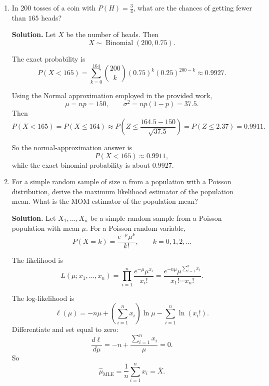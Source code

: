 \documentclass[12pt]{article}
\begin{document}
\begin{enumerate}[label=(\arabic*), leftmargin=*]
\begin{enumerate}[label=(\alph*), itemsep=0.5em]
    \item
    \[
    E(20X-12Y)=20E(X)-12E(Y)=20(23)-12(17)=256,
    \]
    and
    \[
    \operatorname{Var}(20X-12Y)=20^2\operatorname{Var}(X)+(-12)^2\operatorname{Var}(Y)
    =400(4)+144(16)=3904.
    \]

    \item
    \[
    E(5X+8Y)=5E(X)+8E(Y)=5(23)+8(17)=251,
    \]
    and
    \[
    \operatorname{Var}(5X+8Y)=5^2\operatorname{Var}(X)+8^2\operatorname{Var}(Y)
    =25(4)+64(16)=1124.
    \]
\end{enumerate}

\item In 200 tosses of a coin with $P(H)=\tfrac34$, what are the chances of getting fewer than $165$ heads?

\par\medskip
\noindent\textbf{Solution.}
Let $X$ be the number of heads. Then
\[
X\sim \operatorname{Binomial}(200,0.75).
\]

The exact probability is
\[
P(X<165)=\sum_{k=0}^{164}\binom{200}{k}(0.75)^k(0.25)^{200-k}\approx 0.9927.
\]

Using the Normal approximation employed in the provided work,
\[
\mu=np=150,
\qquad
\sigma^2=np(1-p)=37.5.
\]
Then
\[
P(X<165)=P(X\le 164)\approx P\!\left(Z\le \frac{164.5-150}{\sqrt{37.5}}\right)
=P(Z\le 2.37)=0.9911.
\]

So the normal-approximation answer is
\[
P(X<165)\approx 0.9911,
\]
while the exact binomial probability is about $0.9927$.

\item For a simple random sample of size $n$ from a population with a Poisson distribution, derive the maximum likelihood estimator of the population mean. What is the MOM estimator of the population mean?

\par\medskip
\noindent\textbf{Solution.}
Let $X_1,\ldots,X_n$ be a simple random sample from a Poisson population with mean $\mu$. For a Poisson random variable,
\[
P(X=k)=\frac{e^{-\mu}\mu^k}{k!},\qquad k=0,1,2,\ldots
\]

The likelihood is
\[
L(\mu;x_1,\ldots,x_n)=\prod_{i=1}^n \frac{e^{-\mu}\mu^{x_i}}{x_i!}
=\frac{e^{-n\mu}\mu^{\sum_{i=1}^n x_i}}{x_1!\cdots x_n!}.
\]

The log-likelihood is
\[
\ell(\mu)=-n\mu+\left(\sum_{i=1}^n x_i\right)\ln\mu-\sum_{i=1}^n \ln(x_i!).
\]
Differentiate and set equal to zero:
\[
\frac{d\ell}{d\mu}=-n+\frac{\sum_{i=1}^n x_i}{\mu}=0.
\]
So
\[
\hat{\mu}_{\mathrm{MLE}}=\frac{1}{n}\sum_{i=1}^n x_i=\overline{X}.
\]


\end{enumerate}
\end{document}
